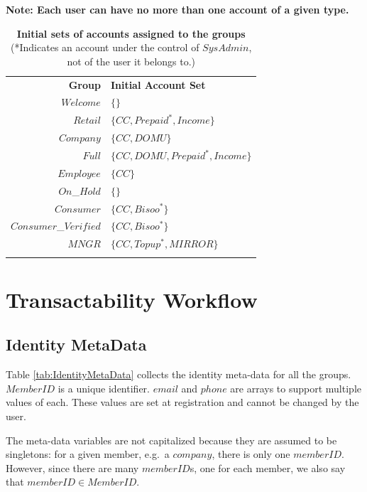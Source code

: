 {\bf Note: Each user can have no more than one account of a given type.}

\begin{table}[h]
\vspace{-0.5cm}
\begin{centering}
\small
{
\begin{tabular}{ r | l  }
\hline
\textbf{Group}	& {\bf Initial Account Set} \\
\Xhline{1.5pt}
$Welcome$	& $\{ \}$ \\
\hline
$Retail$		& $\{ CC, Prepaid^*, Income \}$ \\
\hline
$Company$	& $\{ CC, DOMU \}$ \\
\hline
$Full$		& $\{ CC, DOMU, Prepaid^*, Income \}$ \\
\hline
$Employee$	& $\{ CC \}$ \\
\hline
$On$\_$Hold$	& $\{  \}$ \\
\hline
$Consumer$	& $\{ CC, Bisoo^* \}$ \\
\hline
$Consumer$\_$Verified$ & $\{ CC, Bisoo^* \}$ \\
\hline
$MNGR$ 		& $\{ CC, Topup^*, MIRROR \}$ \\
\Xhline{1.5pt}
\end{tabular}
}
\caption{\small\textbf{Initial sets of accounts assigned to the groups}\\ (*Indicates an account under the control of $SysAdmin$, not of the user it belongs to.)}
\label{tab:InitialAccountSets}
\end{centering}
\vspace{-1cm}
\end{table}

\section{Transactability Workflow}
\subsection{Identity MetaData}
Table \ref{tab:IdentityMetaData} collects the identity meta-data for all the groups. $MemberID$ is a unique identifier. $email$ and $phone$ are arrays to support multiple values of each. These values are set at registration and cannot be changed by the user.

The meta-data variables are not capitalized because they are assumed to be singletons: for a given member, e.g.\ a $company$, there is only one $memberID$. However, since there are many $memberID$s, one for each member, we also say that $memberID \in MemberID$.

